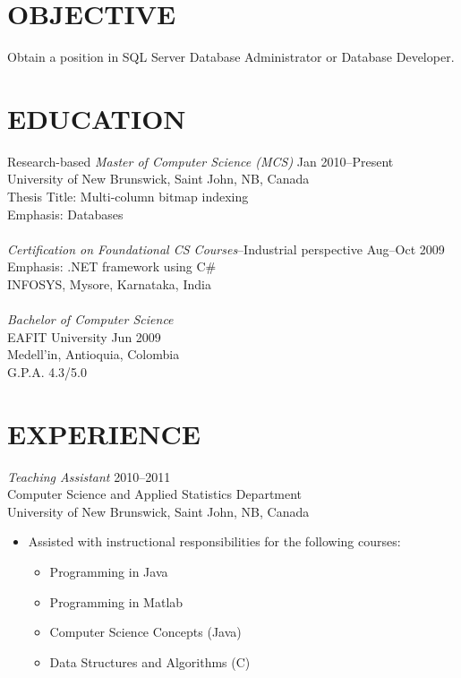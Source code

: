 \documentclass[line,margin]{res}
\begin{document}
\address{19603 Fernhaven, Katy, TX 77449}
\address{(281)-398-9692\\eduardo.gutarra@unb.ca}

 
\begin{resume}

\section{ OBJECTIVE} %
\label{sec:objective}
    Obtain a position in SQL Server Database Administrator or Database Developer.

\section{ EDUCATION} %
\label{sec:education}
    Research-based {\sl Master of Computer Science (MCS)} \hfill Jan 2010--Present\\
    University of New Brunswick, Saint John, NB, Canada\\
    Thesis Title: Multi-column bitmap indexing\\
    Emphasis: Databases\\\\
    {\sl Certification on Foundational CS Courses}--Industrial perspective \hfill Aug--Oct 2009\\
    Emphasis: .NET framework using C\#\\
    INFOSYS, Mysore, Karnataka, India\\\\
    {\sl Bachelor of Computer Science}\\
    EAFIT University \hfill Jun 2009\\
    Medell\a'in, Antioquia, Colombia\\
    G.P.A. 4.3/5.0\\

\section{ EXPERIENCE} %
\label{sec:experience}

{\sl Teaching Assistant} \hfill 2010--2011\\
Computer Science and Applied Statistics Department\\
University of New Brunswick, Saint John, NB, Canada
\begin{itemize} %
    \item Assisted with instructional responsibilities for the following courses:
    \begin{itemize} \itemsep -2pt
        \item Programming in Java
        \item Programming in Matlab
        \item Computer Science Concepts (Java)
        \item Data Structures and Algorithms (C)
    \end{itemize}
\end{itemize}


\end{resume}
\end{document}
